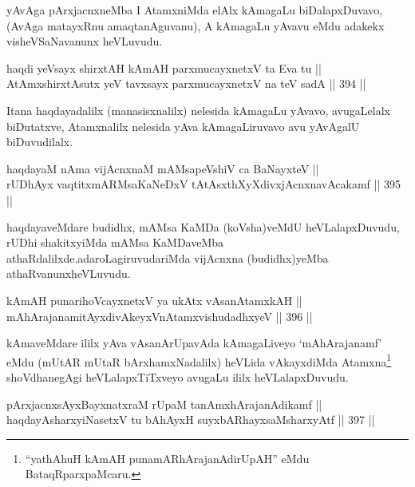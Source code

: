 \begin{artha}
yAvAga pArxjacnxneMba I AtamxniMda elAlx kAmagaLu biDalapxDu\-\break vavo,
(AvAga matayxRnu amaqtanAguvanu), A kAmagaLu yAvavu eMdu adakekx
visheVSaNavanunx heVLuvudu.
\end{artha}


\begin{shl}
haqdi yeV\s sayx shirxtAH kAmAH parxmucayxnetxV ta Eva tu || \\
AtAmxshirxtAsutx yeV tavxsayx parxmucayxnetxV na teV sadA \hfill || 394 ||  
\end{shl}

\begin{artha}
Itana haqdayadalilx (manasisxnalilx) nelesida kAmagaLu yAvavo, avugaLelalx
biDutatxve, Atamxnalilx nelesida yAva kAmagaLiruvavo avu yAvAgalU
biDuvudilalx.
\end{artha}

\begin{shl}
haqdayaM nAma vijAcnxnaM mAMsapeVshiV ca BaNayxteV || \\
rUDhAyx vaqtitxmARMsaKaNeDxV tAtAsxthXyXdivxjAcnxnavAcakamf \hfill || 395 ||  
\end{shl}

\begin{artha}
haqdayaveMdare budidhx, mAMsa KaMDa (koVsha)veMdU heVLalapxDuvudu,
rUDhi shakitxyiMda mAMsa KaMDaveMba
athaRdalilxde.\break adaroLagiruvudariMda vijAcnxna (budidhx)yeMba
athaRvanunx\break heVLuvudu.
\end{artha}


\begin{shl}
kAmAH punarihoVcayxnetxV ya ukAtx vAsanAtamxkAH || \\
mAhArajanamitAyxdivAkeyxVnA\s \s tamxvishudadhxyeV \hfill || 396 ||  
\end{shl}

\begin{artha}
kAmaveMdare ililx yAva vAsanArUpavAda kAmagaLiveyo `mAhArajanamf' eMdu (mUtAR mUtaR bArxhamxNadalilx) heVLida vAkayxdiMda Atamxna\footnote{``yathAhuH kAmAH punamARhArajanAdirUpAH'' eMdu BataqRparxpaMcaru.} shoVdhanegAgi heVLalapxTiTxveyo avugaLu ililx heVLalapxDuvudu.
\end{artha}


\begin{shl}
pArxjacnxsAyxBayxnatxraM rUpaM tanAmxhArajanAdikamf || \\
haqdayAsharxyiNasetxV tu bAhAyxH suyxbARhayxsaMsharxyAtf \hfill || 397 ||
\end{shl}


